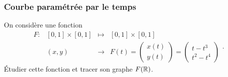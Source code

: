 \subsubsection{Courbe paramétrée par le temps}

On considère une fonction 
$$
\begin{array}{rrcl}
  F : & [0, 1] \times [0, 1] & \mapsto & [0, 1] \times [0, 1] \\
  & (x, y) & \to & F(t) 
  = \left(\begin{array}{c} x(t) \\ y(t) \end{array}\right)
  = \left(\begin{array}{c} t - t^3 \\ t^2 - t^4 \end{array}\right)
\end{array}.
$$
\'Etudier cette fonction et tracer son graphe $F(\mathbb{R})$.

